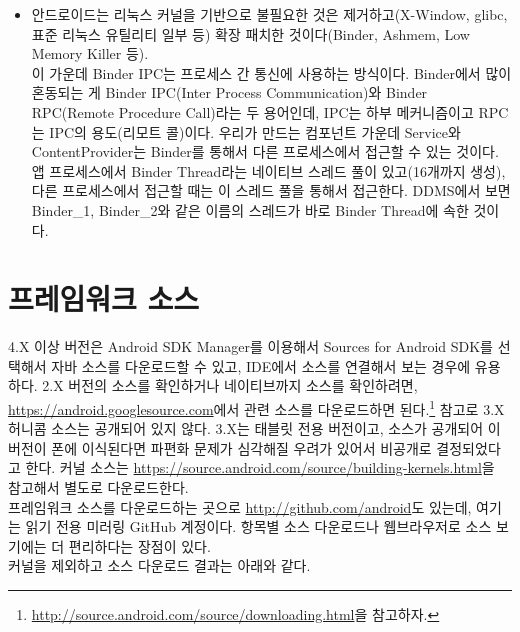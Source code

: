 \begin{itemize}
\item 안드로이드는 리눅스 커널을 기반으로 불필요한 것은 제거하고(X-Window, glibc, 표준 리눅스 유틸리티 일부 등) 확장 패치한 것이다(Binder, Ashmem, Low Memory Killer 등).\\
이 가운데 Binder IPC는 프로세스 간 통신에 사용하는 방식이다. 
Binder에서 많이 혼동되는 게 Binder IPC(Inter Process Communication)와 Binder RPC(Remote Procedure Call)라는 두 용어인데, IPC는 하부 메커니즘이고 RPC는 IPC의 용도(리모트 콜)이다. 우리가 만드는 컴포넌트 가운데 Service와 ContentProvider는 Binder를 통해서 다른 프로세스에서 접근할 수 있는 것이다. 앱 프로세스에서 Binder Thread라는 네이티브 스레드 풀이 있고(16개까지 생성), 다른 프로세스에서 접근할 때는 이 스레드 풀을 통해서 접근한다.
DDMS에서 보면 Binder\_1, Binder\_2와 같은 이름의 스레드가 바로 Binder Thread에 속한 것이다. 

\end{itemize}
\section{프레임워크 소스}
4.X 이상 버전은 Android SDK Manager를 이용해서 Sources for Android SDK를 선택해서 자바 소스를 다운로드할 수 있고, IDE에서 소스를 연결해서 보는 경우에 유용하다. 
2.X 버전의 소스를 확인하거나 네이티브까지 소스를 확인하려면, \url{https://android.googlesource.com}에서 관련 소스를 다운로드하면 된다.\footnote{\url{http://source.android.com/source/downloading.html}을 참고하자.} 참고로 3.X 허니콤 소스는 공개되어 있지 않다. 
3.X는 태블릿 전용 버전이고, 소스가 공개되어 이 버전이 폰에 이식된다면 파편화 문제가 심각해질 우려가 있어서 비공개로 결정되었다고 한다.
커널 소스는 \url{https://source.android.com/source/building-kernels.html}을 참고해서 별도로 다운로드한다.\\
 
프레임워크 소스를 다운로드하는 곳으로 \url{http://github.com/android}도 있는데, 여기는 읽기 전용 미러링 GitHub 계정이다. 항목별 소스 다운로드나 웹브라우저로 소스 보기에는 더 편리하다는 장점이 있다.\\

커널을 제외하고 소스 다운로드 결과는 아래와 같다.

